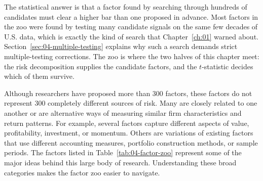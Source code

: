 The statistical answer is that a factor found by searching through hundreds of candidates must clear a higher bar than one proposed in advance. Most factors in the zoo were found by testing many candidate signals on the same few decades of U.S. data, which is exactly the kind of search that Chapter~\ref{ch:01} warned about. Section~\ref{sec:04-multiple-testing} explains why such a search demands strict multiple-testing corrections. The zoo is where the two halves of this chapter meet: the risk decomposition supplies the candidate factors, and the $t$-statistic decides which of them survive.

Although researchers have proposed more than 300 factors, these
factors do not represent 300 completely different sources of risk.
Many are closely related to one another or are alternative ways of
measuring similar firm characteristics and return patterns. For
example, several factors capture different aspects of value,
profitability, investment, or momentum. Others are variations of
existing factors that use different accounting measures, portfolio
construction methods, or sample periods. The factors listed in
Table~\ref{tab:04-factor-zoo} represent some of the major ideas
behind this large body of research. Understanding these broad
categories makes the factor zoo easier to navigate.

